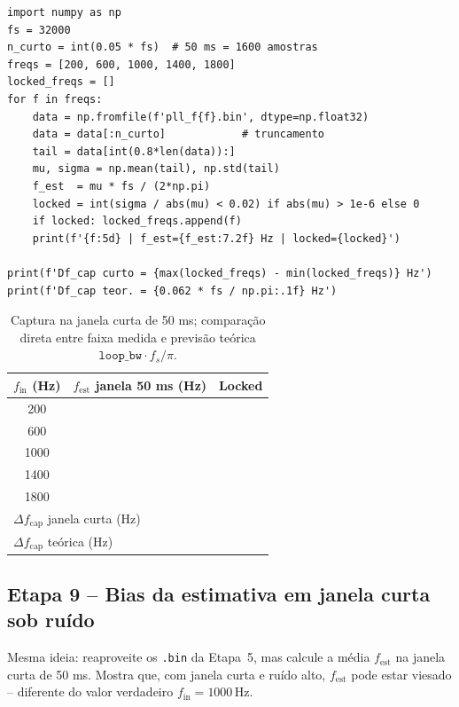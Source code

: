 \documentclass[11pt,a4paper]{article}
\begin{document}
\begin{instrucao}
\begin{verbatim}
import numpy as np
fs = 32000
n_curto = int(0.05 * fs)  # 50 ms = 1600 amostras
freqs = [200, 600, 1000, 1400, 1800]
locked_freqs = []
for f in freqs:
    data = np.fromfile(f'pll_f{f}.bin', dtype=np.float32)
    data = data[:n_curto]            # truncamento
    tail = data[int(0.8*len(data)):]
    mu, sigma = np.mean(tail), np.std(tail)
    f_est  = mu * fs / (2*np.pi)
    locked = int(sigma / abs(mu) < 0.02) if abs(mu) > 1e-6 else 0
    if locked: locked_freqs.append(f)
    print(f'{f:5d} | f_est={f_est:7.2f} Hz | locked={locked}')

print(f'Df_cap curto = {max(locked_freqs) - min(locked_freqs)} Hz')
print(f'Df_cap teor. = {0.062 * fs / np.pi:.1f} Hz')
\end{verbatim}
\end{instrucao}

\begin{table}[H]
  \centering
  \begin{tabular}{c c c}
    \toprule
    $f_\text{in}$ (Hz) & $f_\text{est}$ janela 50 ms (Hz) & Locked \\
    \midrule
    200  & & \\
    600  & & \\
    1000 & & \\
    1400 & & \\
    1800 & & \\
    \midrule
    \multicolumn{2}{l}{$\Delta f_\text{cap}$ janela curta (Hz)} & \\
    \multicolumn{2}{l}{$\Delta f_\text{cap}$ teórica (Hz)} & \\
    \bottomrule
  \end{tabular}
  \caption{Captura na janela curta de 50 ms; comparação direta entre faixa medida e previsão teórica $\texttt{loop\_bw}\cdot f_s/\pi$.}
  \label{tab:janela_curta}
\end{table}

\subsection*{Etapa 9 -- Bias da estimativa em janela curta sob ruído}

Mesma ideia: reaproveite os \texttt{.bin} da Etapa~5, mas calcule a
média $f_\text{est}$ na janela curta de 50 ms. Mostra que, com janela
curta e ruído alto, $f_\text{est}$ pode estar viesado -- diferente do
valor verdadeiro $f_\text{in} = 1000$\,Hz.
\end{document}
